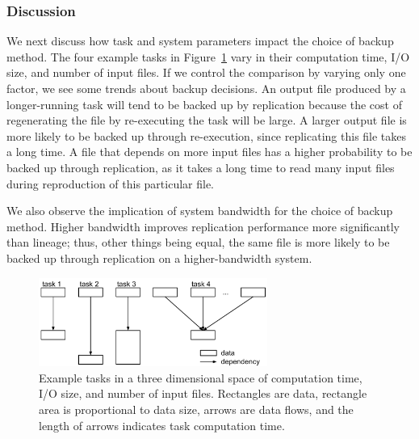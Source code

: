 \documentclass{sig-alternate}
\newcommand{\iannote}[1]{ {\textcolor{red}    { ***Ian:      #1 }}}
\newcommand{\katznote}[1]{ {\textcolor{blue}    { ***Dan:      #1 }}}
\newcommand{\zhaonote}[1]{{\textcolor{cyan}    { ***Zhao:      #1 }}}
\newcommand{\kylenote}[1]{{\textcolor{orange}    { ***Kyle:      #1 }}}
\newcommand{\iannote}[1]{}
\newcommand{\katznote}[1]{}
\newcommand{\zhaonote}[1]{}
\newcommand{\kylenote}[1]{}
\begin{document}
\subsubsection{Discussion}
We next discuss how task and system parameters impact the choice of backup method.
The four example tasks in Figure~\ref{fig:taxonomy} vary in their computation time, I/O size, and number of input files. If we control the comparison by varying only one factor, we see some trends about backup decisions.
An output file produced by a longer-running task will tend to be backed up by replication because the cost of regenerating the file by re-executing the task will be large.
A larger output file is more likely to be backed up through re-execution, since replicating this file takes a long time.
A file that depends on more input files has a higher probability to be backed up through replication, as it takes a long time to read many input files during reproduction of this particular file.

We also observe the implication of system bandwidth for the choice of backup method.
Higher bandwidth improves replication performance more significantly than lineage; thus, other things being equal, the same file is more likely to be backed up through replication on a higher-bandwidth system.

\begin{figure}[ht]
	\begin{center}
		\includegraphics[width=75mm]{pictures/task-taxonomy}
		\caption{Example tasks in a three dimensional space of computation time, I/O size, and number of input files. Rectangles are data, rectangle area is proportional to data size, arrows are data flows, and the length of arrows indicates task computation time.
		\label{fig:taxonomy}}
  	\end{center}
\end{figure}
\end{document}
